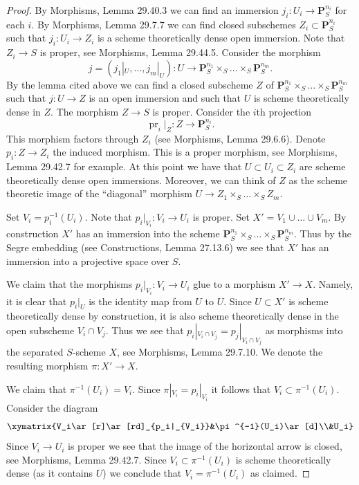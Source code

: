 \documentclass[UTF8,11pt]{ctexart}
\theoremstyle{definition}
\begin{document}
\begin{proof}
By Morphisms, Lemma 29.40.3 we can find an immersion $j_i:U_i\to\mathbf P_S^{n_i}$ for each $i$. By Morphisms, Lemma 29.7.7 we can find closed subschemes $Z_i\subset\mathbf P_S^{n_i}$ such that $j_i:U_i\to Z_i$ is a scheme theoretically dense open immersion. Note that $Z_i\to S$ is proper, see Morphisms, Lemma 29.44.5. Consider the morphism
\[
j=(j_1|_U,\ldots,j_m|_U):U\longrightarrow
\mathbf P_S^{n_1}\times_S\ldots\times_S\mathbf P_S^{n_m}.
\]
By the lemma cited above we can find a closed subscheme $Z$ of $\mathbf P_S^{n_1}\times_S\ldots\times_S\mathbf P_S^{n_m}$ such that $j:U\to Z$ is an open immersion and such that $U$ is scheme theoretically dense in $Z$. The morphism $Z\to S$ is proper. Consider the $i$th projection
\[\operatorname{pr}_i|_Z:Z\longrightarrow\mathbf P_S^{n_i}.\]
This morphism factors through $Z_i$ (see Morphisms, Lemma 29.6.6). Denote $p_i:Z\to Z_i$ the induced morphism. This is a proper morphism, see Morphisms, Lemma 29.42.7 for example. At this point we have that $U\subset U_i\subset Z_i$ are scheme theoretically dense open immersions. Moreover, we can think of $Z$ as the scheme theoretic image of the ``diagonal'' morphism $U\to Z_1\times_S\ldots\times_S Z_m$.

Set $V_i=p_i^{-1}(U_i)$. Note that $p_i|_{V_i}:V_i\to U_i$ is proper. Set $X'=V_1\cup\ldots\cup V_m$. By construction $X'$ has an immersion into the scheme $\mathbf P_S^{n_1}\times_S\ldots\times_S\mathbf P_S^{n_m}$. Thus by the Segre embedding (see Constructions, Lemma 27.13.6) we see that $X'$ has an immersion into a projective space over $S$.

We claim that the morphisms $p_i|_{V_i}:V_i\to U_i$ glue to a morphism $X'\to X$. Namely, it is clear that $p_i|_U$ is the identity map from $U$ to $U$. Since $U\subset X'$ is scheme theoretically dense by construction, it is also scheme theoretically dense in the open subscheme $V_i\cap V_j$. Thus we see that $p_i|_{V_i\cap V_j}=p_j|_{V_i\cap V_j}$ as morphisms into the separated $S$-scheme $X$, see Morphisms, Lemma 29.7.10. We denote the resulting morphism $\pi:X'\to X$.

We claim that $\pi^{-1}(U_i)=V_i$. Since $\pi|_{V_i}=p_i|_{V_i}$ it follows that $V_i\subset\pi^{-1}(U_i)$. Consider the diagram
\[
\xymatrix{V_i\ar[r]\ar[rd]_{p_i|_{V_i}}&\pi^{-1}(U_i)\ar[d]\\&U_i}
\]
Since $V_i\to U_i$ is proper we see that the image of the horizontal arrow is closed, see Morphisms, Lemma 29.42.7. Since $V_i\subset\pi^{-1}(U_i)$ is scheme theoretically dense (as it contains $U$) we conclude that $V_i=\pi^{-1}(U_i)$ as claimed.


\end{proof}
\end{document}
